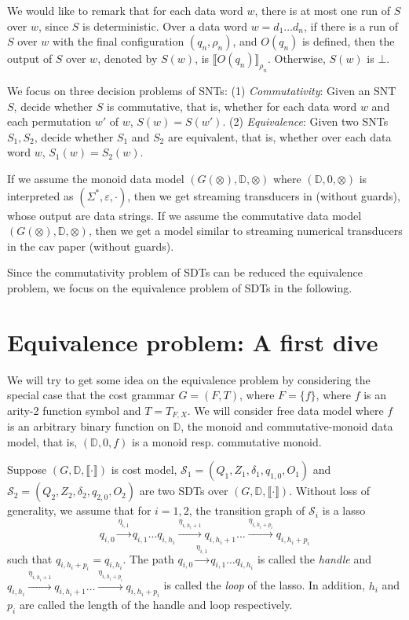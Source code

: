 \documentclass[runningheads,a4paper]{llncs}
\newcommand{\eval}[2]{\llbracket#1\rrbracket_{#2}}
\newcommand\dd{\mathbb{D}}
\newcommand\Ss{\mathcal{S}}
\begin{document}
We would like to remark that for each data word $w$, there is at most one run of $S$ over $w$, since $S$ is deterministic. 
Over a data word $w = d_1 \dots d_n$, if there is a run of $S$ over $w$ with the final configuration $(q_n,\rho_n)$, and $O(q_n)$ is defined, then the output of $S$ over $w$, denoted by ${S}(w)$, is $\eval{O(q_n)}{\rho_n}$. Otherwise, ${S}(w)$ is $\bot$.

We focus on three decision problems of SNTs: (1) \emph{Commutativity}: Given an SNT $S$, decide whether $S$ is commutative, that is, whether for each data word $w$ and each permutation $w'$ of $w$, $S(w)=S(w')$. (2) \emph{Equivalence}: Given two SNTs $S_1,S_2$, decide whether $S_1$ and $S_2$ are equivalent, that is, whether over each data word $w$, $S_1(w)=S_2(w)$.


\begin{example}
If we assume the monoid data model $(G(\otimes), \dd, \otimes)$ where $(\dd, 0, \otimes)$  is interpreted as $(\Sigma^\ast, \varepsilon, \cdot)$, then we get streaming transducers in \cite{RP11} (without guards), whose output are data strings. If we assume the commutative data model $(G(\otimes), \dd, \otimes)$, then we get a model similar to streaming numerical transducers in the cav paper (without guards).
\end{example}

Since the commutativity problem of SDTs can be reduced the equivalence problem, we focus on the equivalence problem of SDTs in the following.

\section{Equivalence problem: A first dive}

We will try to get some idea on the equivalence problem by considering the special case that the cost grammar $G=(F,T)$, where $F=\{f\}$, where $f$ is an arity-2 function symbol and $T = T_{F,X}$. We will consider free data model where $f$ is an arbitrary binary function on $\dd$, the monoid and commutative-monoid data model, that is, $(\dd, 0, f)$ is a monoid resp. commutative monoid.

Suppose $(G, \dd, \llbracket \cdot \rrbracket)$ is cost model, $\Ss_1 = (Q_1, Z_1, \delta_1, q_{1,0}, O_1)$ and $\Ss_2 = (Q_2, Z_2, \delta_2, q_{2,0}, O_2)$ are two SDTs over $(G, \dd, \llbracket \cdot \rrbracket)$. Without loss of generality, we assume that for $i=1,2$, the transition graph of $\Ss_i$ is a lasso 
$$q_{i,0} \xrightarrow{\eta_{i,1}} q_{i, 1}  \dots q_{i, h_i} \xrightarrow{\eta_{i, h_i+1}} q_{i, h_i+1} \dots \xrightarrow{\eta_{i, h_i+p_i}} q_{i, h_i+p_i}$$ 
such that $q_{i, h_i+p_i}= q_{i, h_i}$. The path $q_{i,0} \xrightarrow{\eta_{i,1}} q_{i, 1}  \dots q_{i, h_i}$ is called the \emph{handle} and $q_{i, h_i} \xrightarrow{\eta_{i, h_i+1}} q_{i, h_i+1} \dots \xrightarrow{\eta_{i, h_i+p_i}} q_{i, h_i+p_i}$ is called the \emph{loop} of the lasso. In addition, $h_i$ and $p_i$ are called the length of the handle and loop respectively.
\end{document}
